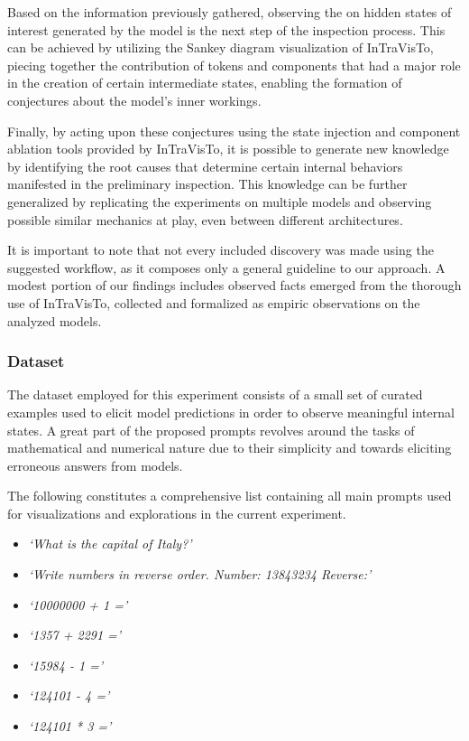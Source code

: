 Based on the information previously gathered, observing the  on hidden states of interest generated by the model is the next step of the inspection process.
This can be achieved by utilizing the Sankey diagram visualization of InTraVisTo, piecing together the contribution of tokens and components that had a major role in the creation of certain intermediate states, enabling the formation of conjectures about the model's inner workings.

Finally, by acting upon these conjectures using the state injection and component ablation tools provided by InTraVisTo, it is possible to generate new knowledge by identifying the root causes that determine certain internal behaviors manifested in the preliminary inspection.
This knowledge can be further generalized by replicating the experiments on multiple models and observing possible similar mechanics at play, even between different architectures.

It is important to note that not every included discovery was made using the suggested workflow, as it composes only a general guideline to our approach.
A modest portion of our findings includes observed facts emerged from the thorough use of InTraVisTo, collected and formalized as empiric observations on the analyzed models.

\subsubsection{Dataset}

The dataset employed for this experiment consists of a small set of curated examples used to elicit model predictions in order to observe meaningful internal states.
A great part of the proposed prompts revolves around the  tasks of mathematical and numerical nature due to their simplicity and  towards eliciting erroneous answers from models.

The following constitutes a comprehensive list containing all main prompts used for visualizations and explorations in the current experiment.

\begin{multicols}{2}
    \begin{itemize}
        \item \emph{`What is the capital of Italy?'}
        \item \emph{`Write numbers in reverse order. Number: 13843234 Reverse:'}
        \item \emph{`10000000 + 1 ='}
        \item \emph{`1357 + 2291 ='}
        \item \emph{`15984 - 1 ='}
        \item \emph{`124101 - 4 ='}
        \item \emph{`124101 * 3 ='}
    \end{itemize}
\end{multicols}

